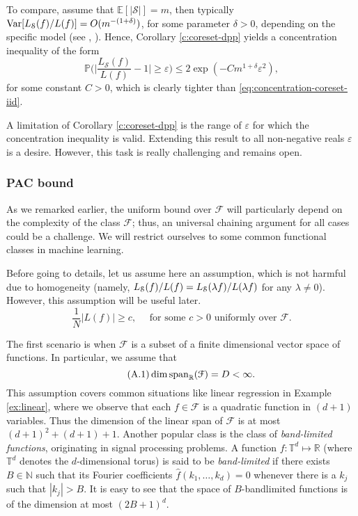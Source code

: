 To compare, assume that $\mathbb E[|\mathcal S|]=m$, then typically $\mathrm{Var}[ L_{\mathcal S}(f)/L(f)] = O(m^{-(1+\delta)})$,  for some parameter $\delta>0$, depending on the specific model (see \cite{OPE-NIPS}, \cite{OPE-AOAP}). Hence, Corollary \ref{c:coreset-dpp} yields a concentration inequality of the form
\begin{equation} \label{eq:concentration-coreset-dpp}
    \mathbb P \Big ( \Big |\frac{L_{\mathcal S}(f)}{L(f)} -1 \Big | \ge \varepsilon \Big ) \le 2 \exp ( -C m^{1+\delta}\varepsilon^2  ),
\end{equation}
for some constant $C>0$, which is clearly tighter than \eqref{eq:concentration-coreset-iid}.

A limitation of Corollary \ref{c:coreset-dpp} is the range of $\varepsilon$ for which the concentration inequality is valid. Extending this result to all non-negative reals $\varepsilon$ is a desire. However, this task is really challenging and remains open.

\subsubsection{PAC bound}
As we remarked earlier, the uniform bound over $\mathcal F$ will particularly depend on the complexity of the class $\mathcal F$; thus, an universal chaining argument for all cases could be a challenge. We will restrict ourselves to some common functional classes in machine learning.

Before going to details, let us assume here an assumption, which is not harmful due to homogeneity (namely, $L_{\mathcal{S}}(f)/L(f) = L_{\mathcal{S}}(\lambda f)/L(\lambda f)$ for any $\lambda \neq 0$). However, this assumption will be useful later.
\begin{equation} \tag{A.0} \label{eq:lowerbound}
   \frac{1}{N}|L(f)| \ge c , \quad \text{ for some } c>0 \text{ uniformly over } \mathcal F.
\end{equation}

The first scenario is when $\mathcal F$ is a subset of a finite dimensional vector space of functions. In particular, we assume that
\begin{equation} \tag{A.1} \label{eq:finite-dim}
    \dim \mathrm{span}_{\mathbb R}(\mathcal F) = D < \infty.
\end{equation}
This assumption covers common situations like linear regression in Example \ref{ex:linear}, where we observe that each $f\in \mathcal F$ is a quadratic function in $(d+1)$ variables. 
Thus the dimension of the linear span of $\mathcal F$ is at most $(d+1)^2 + (d+1) + 1$. 
Another popular class is the class of \emph{band-limited functions}, originating in signal processing problems.
A function $f : \mathbb{T}^d \mapsto \mathbb{R}$ (where  $\mathbb T^d$ denotes the $d$-dimensional torus) is said to be \textit{band-limited} if there exists $B \in \mathbb N$ such that its Fourier coefficients $\hat f (k_1,\ldots,k_d) =0$ whenever there is a $k_j$ such that $|k_j| > B$. 
It is easy to see that the space of $B$-bandlimited functions is of the dimension at most $(2B+1)^d$.

